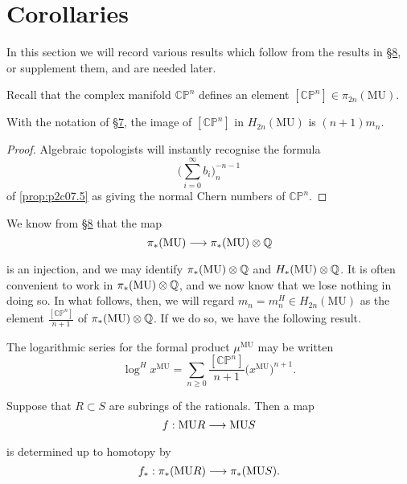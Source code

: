 \documentclass[../main]{subfiles}
\begin{document}
\label{sec:p2c9}
\chapter{Corollaries}
In this section we will record various results which follow from the results in \hyperref[sec:p2c8]{\S 8}, or supplement them, and are needed later.

Recall that the complex manifold $\mathbb {CP}^n$ defines an element $[\mathbb {CP}^n] \in \pi_{2n} (\mathrm {MU})$.

\begin{lemma}
\label{lem:p2c09.1}
With the notation of \hyperref[sec:p2c7]{\S 7}, the image of $[\mathbb {CP}^n]$ in $H_{2n}(\mathrm {MU})$ is $(n + 1)m_n$.
\end{lemma}

\begin{proof}
Algebraic topologists will instantly recognise the formula \[\bigg(\sum_{i = 0}^\infty b_i\bigg)_n^{-n - 1}\] of \eqref{prop:p2c07.5} as giving the normal Chern numbers of $\mathbb {CP}^n$.
\end{proof}
We know from \hyperref[sec:p2c8]{\S 8} that the map \[\pi_\ast(\mathrm{MU}) \lar{} \pi_\ast(\mathrm {MU}) \otimes \bbQ\] is an injection, and we may identify $\pi_\ast(\mathrm{MU}) \otimes \mathbb{Q}$ and $H_\ast(\mathrm{MU}) \otimes \mathbb{Q}$. It is often convenient to work in $\pi_\ast(\mathrm{MU}) \otimes \mathbb{Q}$, and we now know that we lose nothing in doing so. In what follows, then, we will regard $m_n = m_n^H \in H_{2n}(\mathrm{MU})$ as the element $\tfrac {[\mathbb {CP}^n]} {n + 1}$ of $\pi_\ast(\mathrm {MU}) \otimes \mathbb{Q}$. If we do so, we have the following result. 

\begin{corollary}
\label{cor:p2c09.2}
The logarithmic series for the formal product $\mu^{\mathrm{MU}}$ may be written \[\log^{H} x^{\mathrm{MU}} = \sum_{n \ge 0} \frac {[\mathbb {CP}^n]} {n + 1} \big(x^{\mathrm {MU}}\big)^{n + 1}.\]
\end{corollary}

\begin{lemma}
\label{lem:p2c09.3}
Suppose that $R \subset S$ are subrings of the rationals. Then a map \[f : \te{MU}R \lar{} \te{MU}S\] is determined up to homotopy by \[f_\ast : \pi_\ast(\te{MU}R) \lar{} \pi_\ast(\te{MU}S).\]
\end{lemma}
\end{document}
